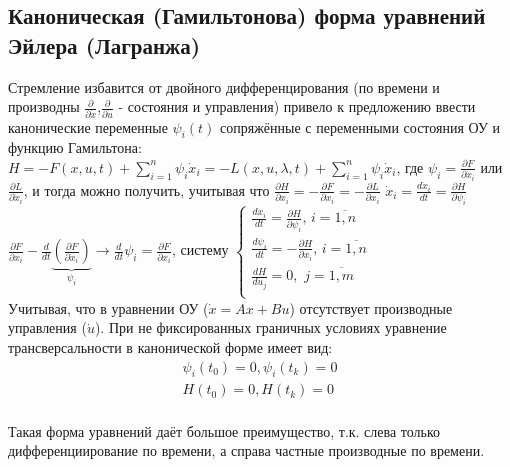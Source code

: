 \documentclass[preprint,russian,a5paper,10pt,twoside,mediummath]{ncc}
\begin{document}
	\subsection{Каноническая (Гамильтонова) форма уравнений Эйлера (Лагранжа)\label{variations:Canonical_Euler}}
Стремление избавится от двойного дифференцирования (по времени и производны  $\frac{\partial }{\partial \dot{x}}$,$\frac{\partial }{\partial \dot{u}}$ - состояния и управления) привело к предложению ввести канонические переменные ${{\psi }_{i}}\left( t \right)$ сопряжённые с переменными состояния ОУ и функцию Гамильтона: $H=-F\left( x,u,t \right)+\sum\limits_{i=1}^{n}{{{\psi }_{i}}{{{\dot{x}}}_{i}}}=-L\left( x,u,\lambda ,t \right)+\sum\limits_{i=1}^{n}{{{\psi }_{i}}{{{\dot{x}}}_{i}}}$, где ${{\psi }_{i}}=\frac{\partial F}{\partial {{{\dot{x}}}_{i}}}$ или $\frac{\partial L}{\partial {{{\dot{x}}}_{i}}}$, и тогда можно получить, учитывая что $\frac{\partial H}{\partial {{x}_{i}}}=-\frac{\partial F}{\partial {{x}_{i}}}=-\frac{\partial L}{\partial {{x}_{i}}}$ ${{\dot{x}}_{i}}=\frac{d{{{\dot{x}}}_{i}}}{dt}=\frac{\partial H}{\partial {{\psi }_{i}}}$ $\frac{\partial F}{\partial {{x}_{i}}}-\frac{d}{dt}\underbrace{\left( \frac{\partial F}{\partial {{{\dot{x}}}_{i}}} \right)}_{{{\psi }_{i}}}\to \frac{d}{dt}{{\psi }_{i}}=\frac{\partial F}{\partial {{x}_{i}}}$, систему
$\left\{ \begin{array}{*{35}{l}}
   \frac{d{{x}_{i}}}{dt}=\frac{\partial H}{\partial {{\psi }_{i}}},\,i=\overline{1,n}  \\
   \frac{d{{\psi }_{i}}}{dt}=-\frac{\partial H}{\partial {{x}_{i}}},\,i=\overline{1,n}  \\
   \frac{dH}{d{{u}_{j}}}=0,\,\,j=\overline{1,m}  \\
\end{array} \right.$
\\Учитывая, что в уравнении ОУ ($\dot{x}=Ax+Bu$) отсутствует производные управления ($\dot{u}$). При не фиксированных граничных условиях уравнение трансверсальности в канонической форме имеет вид: 
\[\begin{array}{*{35}{l}}
   {{\psi }_{i}}\left( {{t}_{0}} \right)=0,{{\psi }_{i}}\left( {{t}_{k}} \right)=0  \\
   H\left( {{t}_{0}} \right)=0,H\left( {{t}_{k}} \right)=0  \\
\end{array}\]
\par Такая форма уравнений даёт большое преимущество, т.к. слева только дифференциирование по времени, а справа частные производные по времени.
\end{document}
